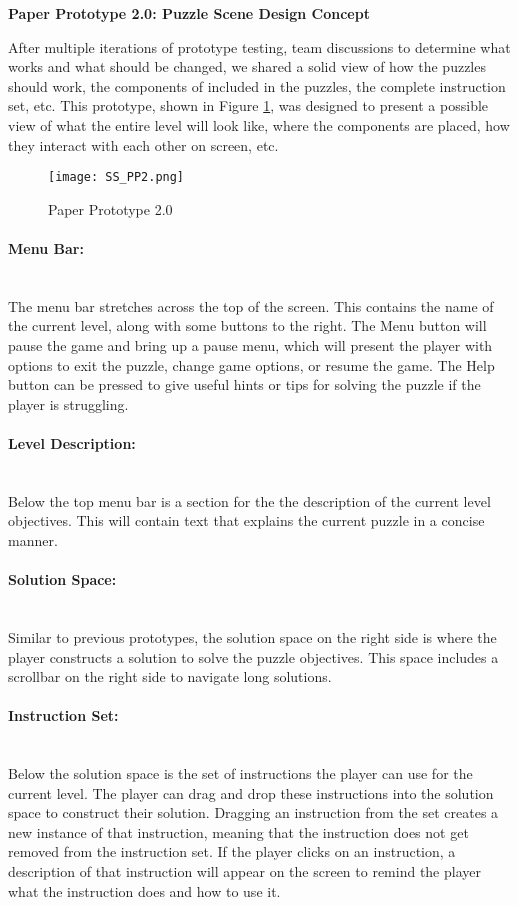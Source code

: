 \textbf{Paper Prototype 2.0: Puzzle Scene Design Concept}

After multiple iterations of prototype testing, team discussions to determine what works and what should be changed, we shared a solid view of how the puzzles should work, the components of included in the puzzles, the complete instruction set, etc.
This prototype, shown in Figure \ref{fig:Paper_Prototype_2.0}, was designed to present a possible view of what the entire level will look like, where the components are placed, how they interact with each other on screen, etc.


\begin{figure}[H]
  \caption{Paper Prototype 2.0}
  \label{fig:Paper_Prototype_2.0}
  \centering
  \texttt{[image: SS\_PP2.png]}
\end{figure}


\paragraph{Menu Bar:} ~\\
The menu bar stretches across the top of the screen. This contains the name of the current level, along with some buttons to the right.
The Menu button will pause the game and bring up a pause menu, which will present the player with options to exit the puzzle, change game options, or resume the game.
The Help button can be pressed to give useful hints or tips for solving the puzzle if the player is struggling.


\paragraph{Level Description:} ~\\
Below the top menu bar is a section for the the description of the current level objectives. This will contain text that explains the current puzzle in a concise manner.


\paragraph{Solution Space:} ~\\
Similar to previous prototypes, the solution space on the right side is where the player constructs a solution to solve the puzzle objectives. This space includes a scrollbar on the right side to navigate long solutions.


\paragraph{Instruction Set:} ~\\
Below the solution space is the set of instructions the player can use for the current level.
The player can drag and drop these instructions into the solution space to construct their solution.
Dragging an instruction from the set creates a new instance of that instruction, meaning that the instruction does not get removed from the instruction set.
If the player clicks on an instruction, a description of that instruction will appear on the screen to remind the player what the instruction does and how to use it.


